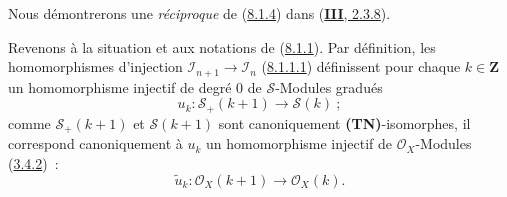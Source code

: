 Nous démontrerons une \emph{réciproque} de
(\hyperref[II.8.1.4-fr]{8.1.4}) dans
(\hyperref[III.2.3.8-fr]{\textbf{III}, 2.3.8}).

\begin{env}[8.1.5]
\label{II.8.1.5-fr}
Revenons à la situation et aux notations de
(\hyperref[II.8.1.1-fr]{8.1.1}). Par définition, les homomorphismes
d'injection $\mathcal{I}_{n+1}\to\mathcal{I}_n$
(\hyperref[II.8.1.1.1-fr]{8.1.1.1}) définissent pour chaque $k\in\mathbf{Z}$ un
homomorphisme injectif de degré $0$ de $\mathcal{S}$-Modules gradués
\begin{equation}
\label{II.8.1.5.1-fr}
  u_k:\mathcal{S}_+(k+1)\to\mathcal{S}(k)~;
\tag{8.1.5.1}
\end{equation}
comme $\mathcal{S}_+(k+1)$ et $\mathcal{S}(k+1)$ sont canoniquement
\textbf{(TN)}-isomorphes, il correspond canoniquement à $u_k$ un homomorphisme injectif
de $\mathcal{O}_X$-Modules (\hyperref[II.3.4.2-fr]{3.4.2})~:
\begin{equation}
\label{II.8.1.5.2-fr}
  \widetilde{u}_k:\mathcal{O}_X(k+1)\to\mathcal{O}_X(k).
\tag{8.1.5.2}
\end{equation}


\end{env}
